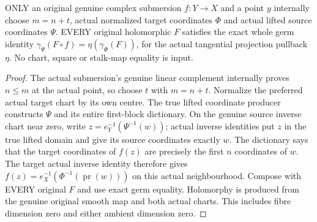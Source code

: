 \begin{lemma}
\label{hir:submersion-germ-colon-actual-projection-square}
\leanok
ONLY an original genuine complex submersion $f:Y\to X$ and a point $y$
internally choose $m=n+t$, actual normalized target coordinates $\Phi$ and
actual lifted source coordinates $\Psi$. EVERY original holomorphic $F$
satisfies the exact whole germ identity
$\gamma_\Psi(F\circ f)=\eta(\gamma_\Phi(F))$, for the actual tangential
projection pullback $\eta$. No chart, square or stalk-map equality is input.
\end{lemma}
\begin{proof}
The actual submersion's genuine linear complement internally proves $n\le m$
at the actual point, so choose $t$ with $m=n+t$. Normalize the preferred
actual target chart by its own centre. The true lifted coordinate producer
constructs $\Psi$ and its entire first-block dictionary. On the genuine
source inverse chart near zero, write $z=e_Y^{-1}(\Psi^{-1}(w))$; actual
inverse identities put $z$ in the true lifted domain and give its source
coordinates exactly $w$. The dictionary says that the target coordinates
of $f(z)$ are precisely the first $n$ coordinates of $w$. The target actual
inverse identity therefore gives
$f(z)=e_X^{-1}(\Phi^{-1}(\operatorname{pr}(w)))$ on this actual neighbourhood.
Compose with EVERY original $F$ and use exact germ equality. Holomorphy is
produced from the genuine original smooth map and both actual charts. This
includes fibre dimension zero and either ambient dimension zero.
\end{proof}

